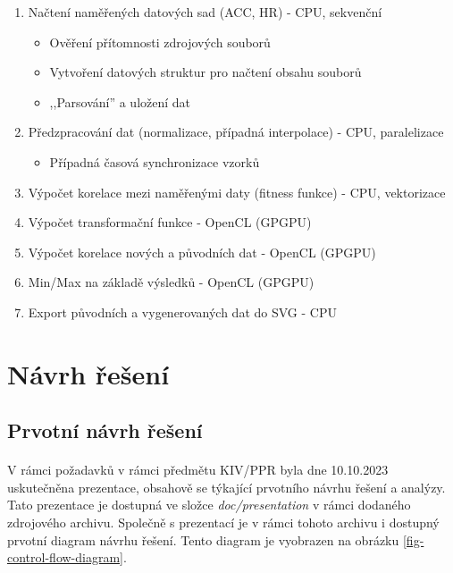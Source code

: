 \documentclass[12pt, a4paper]{article}
\begin{document}
\begin{enumerate}
  \item Načtení naměřených datových sad (ACC, HR) - CPU, sekvenční
    \begin{itemize}
      \item Ověření přítomnosti zdrojových souborů
      \item Vytvoření datových struktur pro načtení obsahu souborů
      \item ,,Parsování'' a uložení dat
    \end{itemize}
  \item Předzpracování dat (normalizace, případná interpolace) - CPU, paralelizace
    \begin{itemize}
      \item Případná časová synchronizace vzorků
    \end{itemize}
  \item Výpočet korelace mezi naměřenými daty (fitness funkce) - CPU, vektorizace
  \item Výpočet transformační funkce - OpenCL (GPGPU)
  \item Výpočet korelace nových a původních dat - OpenCL (GPGPU)
  \item Min/Max na základě výsledků - OpenCL (GPGPU)
  \item Export původních a vygenerovaných dat do SVG - CPU
\end{enumerate}

\newpage
\section{Návrh řešení}
\subsection{Prvotní návrh řešení}
\paragraph{} V rámci požadavků v rámci předmětu KIV/PPR byla dne 10.10.2023 uskutečněna prezentace, obsahově se týkající prvotního návrhu řešení a analýzy.
Tato prezentace je dostupná ve složce \textit{doc/presentation} v rámci dodaného zdrojového archivu.
Společně s prezentací je v rámci tohoto archivu i dostupný prvotní diagram návrhu řešení. 
Tento diagram je vyobrazen na obrázku \ref{fig-control-flow-diagram}. 
\end{document}
